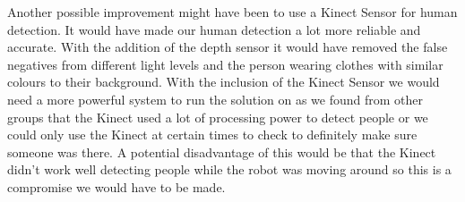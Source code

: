 Another possible improvement might have been to use a Kinect Sensor for human detection. It would have made our human detection a lot more reliable and accurate. With the addition of the depth sensor it would have removed the false negatives from different light levels and the person wearing clothes with similar colours to their background. With the inclusion of the Kinect Sensor we would need a more powerful system to run the solution on as we found from other groups that the Kinect used a lot of processing power to detect people or we could only use the Kinect at certain times to check to definitely make sure someone was there. A potential disadvantage of this would be that the Kinect didn’t work well detecting people while the robot was moving around so this is a compromise we would have to be made.


\printbibliography
